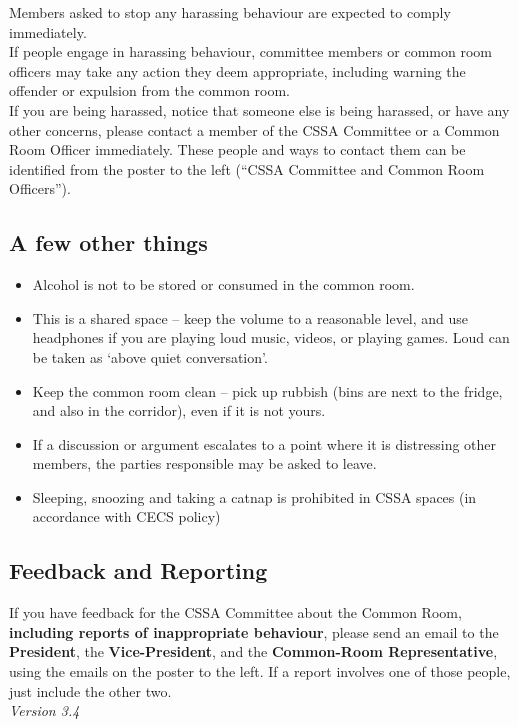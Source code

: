 \documentclass[a3paper,14pt]{extarticle}
\begin{document}
Members asked to stop any harassing behaviour are expected to comply
immediately.\\[1pt]
 
If people engage in harassing behaviour, committee members or common
room officers may take any action they deem appropriate, including
warning the offender or expulsion from the common room.\\[1pt]

If you are being harassed, notice that someone else is being harassed,
or have any other concerns, please contact a member of the CSSA
Committee or a Common Room Officer immediately. These people and ways to
contact them can be identified from the poster to the left (``CSSA
Committee and Common Room Officers'').

\subsection*{A few other things}\label{a-few-other-things}

\begin{itemize}
\item
  Alcohol is not to be stored or consumed in the common room.
\item
  This is a shared space -- keep the volume to a reasonable level, and
  use headphones if you are playing loud music, videos, or playing
  games. Loud can be taken as `above quiet conversation'.
\item
  Keep the common room clean -- pick up rubbish (bins are next to the
  fridge, and also in the corridor), even if it is not yours.
\item
  If a discussion or argument escalates to a point where it is
  distressing other members, the parties responsible may be asked to
  leave.
\item
  Sleeping, snoozing and taking a catnap is prohibited in CSSA spaces (in accordance with CECS policy)
\end{itemize}

\subsection*{Feedback and Reporting}\label{feedback-and-reporting}

If you have feedback for the CSSA Committee about the Common Room,
\textbf{including reports of inappropriate behaviour}, please send an
email to the \textbf{President}, the \textbf{Vice-President}, and the
\textbf{Common-Room Representative}, using the emails on the poster to
the left. If a report involves one of those people, just include the
other two.\\[12pt]

\emph{Version 3.4}
\end{document}
